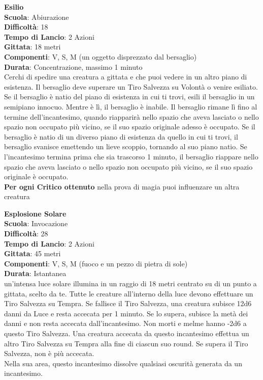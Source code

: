 \begin{multicols}{2}
\medskip\textbf{Esilio}\\
\textbf{Scuola}: Abiurazione\\
\textbf{Difficoltà}:  18\\
\textbf{Tempo di Lancio}: 2 Azioni\\
\textbf{Gittata}: 18 metri\\
\textbf{Componenti}: V, S, M (un oggetto disprezzato dal bersaglio)\\
\textbf{Durata}: Concentrazione, massimo 1 minuto\\
Cerchi di spedire una creatura a gittata e che puoi vedere in un altro piano di esistenza. Il bersaglio deve superare un Tiro Salvezza su Volontà o venire esiliato. Se il bersaglio è natio del piano di esistenza in cui ti trovi, esili il bersaglio in un semipiano innocuo. Mentre è lì, il bersaglio è inabile. Il bersaglio rimane lì fino al termine dell'incantesimo, quando riapparirà nello spazio che aveva lasciato o nello spazio non occupato più vicino, se il suo spazio originale adesso è occupato. Se il bersaglio è natio di un diverso piano di esistenza da quello in cui ti trovi, il bersaglio svanisce emettendo un lieve scoppio, tornando al suo piano natio. Se l'incantesimo termina prima che sia trascorso 1 minuto, il bersaglio riappare nello spazio che aveva lasciato o nello spazio non occupato più vicino, se il suo spazio originale è occupato.\\
\textbf{Per ogni Critico ottenuto} nella prova di magia puoi influenzare un altra creatura

\medskip\textbf{Esplosione Solare}\\
\textbf{Scuola}: Invocazione\\
\textbf{Difficoltà}:  28\\
\textbf{Tempo di Lancio}: 2 Azioni\\
\textbf{Gittata}: 45 metri\\
\textbf{Componenti}: V, S, M (fuoco e un pezzo di pietra di sole)\\
\textbf{Durata}: Istantanea\\
un'intensa luce solare illumina in un raggio di 18 metri centrato su di un punto a gittata, scelto da te. Tutte le creature all'interno della luce devono effettuare un Tiro Salvezza su Tempra. Se fallisce il Tiro Salvezza, una creatura subisce 12d6 danni da Luce e resta accecata per 1 minuto. Se lo supera, subisce la metà dei danni e non resta accecata dall'incantesimo. Non morti e melme hanno -2d6 a questo Tiro Salvezza. Una creatura accecata da questo incantesimo effettua un altro Tiro Salvezza su Tempra alla fine di ciascun suo round. Se supera il Tiro Salvezza, non è più accecata.\\
Nella sua area, questo incantesimo dissolve qualsiasi oscurità generata da un incantesimo. 


\end{multicols}
